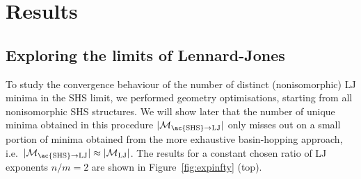 \section{Results}

\subsection{Exploring the limits of Lennard-Jones}

To study the convergence behaviour of the number of distinct (nonisomorphic) LJ minima in
the \ac{SHS} limit, we performed geometry optimisations,
starting from all nonisomorphic \ac{SHS} structures.  We will show later that the
number of unique minima obtained in this procedure $|\mathcal{M}_\mathrm{\ac{SHS}\to
LJ}|$ only misses out on a small portion of minima obtained from the more exhaustive
basin-hopping approach, i.e.~$|\mathcal{M}_\mathrm{\ac{SHS}\to
LJ}|\approx|\mathcal{M}_\mathrm{LJ}|$.  The results for a constant chosen ratio
of LJ exponents $n/m=2$ are shown in Figure~\ref{fig:expinfty} (top). 
